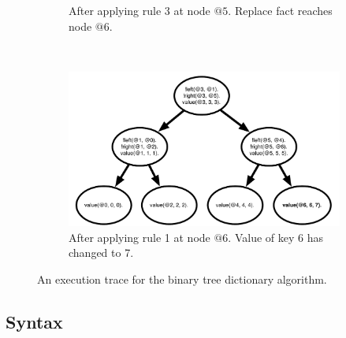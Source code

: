 \begin{figure}[h]
\begin{subfigure}[b]{0.5\textwidth}
                \caption{After applying rule 3 at node $@5$. Replace fact reaches node $@6$.}
                \label{fig:btree_trace3}
        \end{subfigure}%
        ~
        \begin{subfigure}[b]{0.5\textwidth}
                  \includegraphics[width=\textwidth]{btree_trace4}
                  \caption{After applying rule 1 at node $@6$. Value of key 6 has changed to 7.}
                  \label{fig:btree_trace4}
          \end{subfigure}
        \caption{An execution trace for the binary tree dictionary algorithm.}\label{fig:btree_trace}
        \vspace{-0.5\intextsep}
\end{figure}

\subsection{Syntax}

